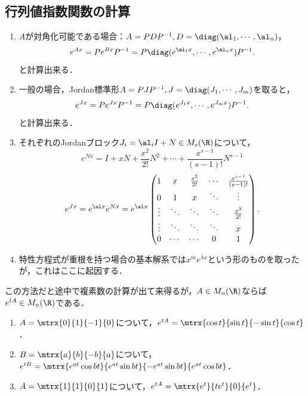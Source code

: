 \documentclass[uplatex,dvipdfmx]{jsreport}
\begin{document}
\subsection{行列値指数関数の計算}

\begin{observation}[標準形による行列値指数関数の計算]\mbox{}
    \begin{enumerate}
        \item $A$が対角化可能である場合：$A=PDP^{-1},D=\diag(\al_1,\cdots,\al_n)$，
        \[e^{Ax}=Pe^{Bx}P^{-1}=P\diag(e^{\al_1x},\cdots,e^{\al_nx})P^{-1}.\]
        と計算出来る．
        \item 一般の場合，Jordan標準形$A=PJP^{-1},J=\diag(J_1,\cdots,J_m)$を取ると，
        \[e^{Jx}=Pe^{Jx}P^{-1}=P\diag(e^{J_1x},\cdots,e^{J_mx})P^{-1}.\]
        と計算出来る．
        \item それぞれのJordanブロック$J_i=\al_iI+N\in M_s(\R)$について，
        \[e^{Nx}=I+xN+\frac{x^2}{2!}N^2+\cdots+\frac{x^{s-1}}{(s-1)!}N^{s-1}\]
        \[e^{Jx}=e^{\al x}e^{Nx}=e^{\al x} \begin{pmatrix}1&x&\frac{x^2}{2!}&\cdots&\frac{x^{s-1}}{(s-1)!}\\
        0&1&x&\ddots&\vdots\\
        \vdots&\ddots&\ddots&\ddots&\frac{x^2}{2!}\\
        \vdots&\ddots&\ddots&\ddots&x\\
        0&\cdots&\cdots&0&1
        \end{pmatrix}.\]
        \item 特性方程式が重根を持つ場合の基本解系では$x^{m}e^{\lambda x}$という形のものを取ったが，これはここに起因する．
    \end{enumerate}
\end{observation}
\begin{remark}
    この方法だと途中で複素数の計算が出て来得るが，$A\in M_n(\R)$ならば$e^{tA}\in M_n(\R)$である．
\end{remark}
\begin{example}\mbox{}
    \begin{enumerate}
        \item $A=\mtrx{0}{1}{-1}{0}$について，$e^{tA}=\mtrx{\cos t}{\sin t}{-\sin t}{\cos t}$．
        \item $B=\mtrx{a}{b}{-b}{a}$について，$e^{tB}=\mtrx{e^{at}\cos bt}{e^{at}\sin bt}{-e^{at}\sin bt}{e^{at}\cos bt}$．
        \item $A=\mtrx{1}{1}{0}{1}$について，$e^{tA}=\mtrx{e^t}{te^t}{0}{e^t}$．
    \end{enumerate}
\end{example}
\end{document}

